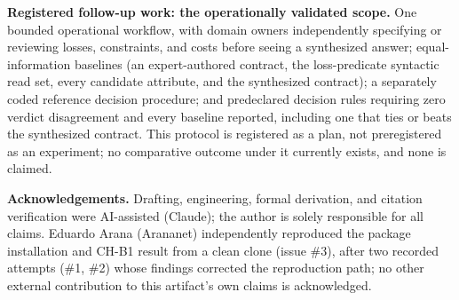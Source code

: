 \documentclass[11pt,a4paper]{article}
\theoremstyle{definition}
\begin{document}
\noindent\textbf{Registered follow-up work: the operationally validated scope.} One bounded operational workflow, with domain owners independently specifying or reviewing losses, constraints, and costs before seeing a synthesized answer; equal-information baselines (an expert-authored contract, the loss-predicate syntactic read set, every candidate attribute, and the synthesized contract); a separately coded reference decision procedure; and predeclared decision rules requiring zero verdict disagreement and every baseline reported, including one that ties or beats the synthesized contract. This protocol is registered as a plan, not preregistered as an experiment; no comparative outcome under it currently exists, and none is claimed.

\textbf{Acknowledgements.} Drafting, engineering, formal derivation, and citation verification were AI-assisted (Claude); the author is solely responsible for all claims. Eduardo Arana (Arananet) independently reproduced the package installation and CH-B1 result from a clean clone (issue \#3), after two recorded attempts (\#1, \#2) whose findings corrected the reproduction path; no other external contribution to this artifact's own claims is acknowledged.

\nocite{*}


\end{document}
